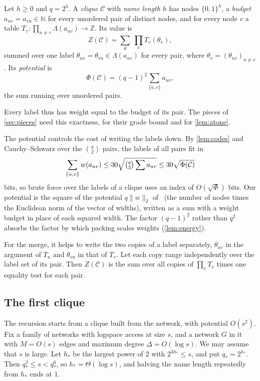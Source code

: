 \documentclass[11pt]{article}
\theoremstyle{definition}
\theoremstyle{definition}
\theoremstyle{remark}
\newcommand{\Z}{\mathbb{Z}}
\newcommand{\N}{\mathbb{N}}
\newcommand{\norm}[1]{\lVert #1\rVert}
\begin{document}
\begin{definition}\label{def:clique}
Let $h\ge0$ and $q=2^h$. A \emph{clique} $\mathcal C$ with \emph{name length} $h$ has nodes $\{0,1\}^h$, a \emph{budget} $a_{uv}=a_{vu}\in\N$ for every unordered pair of distinct nodes, and for every node $v$ a table $T_v\colon\prod_{u\ne v}\Lambda(a_{uv})\to\Z$. Its value is
\[
Z(\mathcal C)=\sum_\theta\ \prod_vT_v(\theta_v),
\]
summed over one label $\theta_{uv}=\theta_{vu}\in\Lambda(a_{uv})$ for every pair, where $\theta_v=(\theta_{uv})_{u\ne v}$. Its \emph{potential} is
\[
\Phi(\mathcal C)=(q-1)^2\sum_{\{u,v\}}a_{uv},
\]
the sum running over unordered pairs.
\end{definition}

Every label thus has weight equal to the budget of its pair. The pieces of \cref{sec:pieces} need this exactness, for their grade bound and for \cref{lem:atone}.

The potential controls the cost of writing the labels down. By \cref{lem:codes} and Cauchy--Schwarz over the $\binom q2$ pairs, the labels of all pairs fit in
\[
\sum_{\{u,v\}}w(a_{uv})\le30\sqrt{\tbinom q2\sum a_{uv}}\le30\sqrt{\Phi(\mathcal C)}
\]
bits, so brute force over the labels of a clique uses an index of $O(\sqrt\Phi)$ bits. Our potential is the square of the potential $q\norm w_2$ of~\cite{Zhu26} (the number of nodes times the Euclidean norm of the vector of widths), written as a sum with a weight budget in place of each squared width. The factor $(q-1)^2$ rather than $q^2$ absorbs the factor by which packing scales weights (\cref{lem:energy}).

For the merge, it helps to write the two copies of a label separately, $\theta_{uv}$ in the argument of $T_u$ and $\theta_{vu}$ in that of $T_v$. Let each copy range independently over the label set of its pair. Then $Z(\mathcal C)$ is the sum over all copies of $\prod_vT_v$ times one equality test for each pair.

\subsection{The first clique}\label{sec:top}

The recursion starts from a clique built from the network, with potential $O(s^2)$. Fix a family of networks with logspace access at size $s$, and a network $G$ in it with $M=O(s)$ edges and maximum degree $\Delta=O(\log s)$. We may assume that $s$ is large. Let $h_*$ be the largest power of $2$ with $2^{3h_*}\le s$, and put $q_*=2^{h_*}$. Then $q_*^3\le s<q_*^6$, so $h_*=\Theta(\log s)$, and halving the name length repeatedly from $h_*$ ends at $1$.
\end{document}
